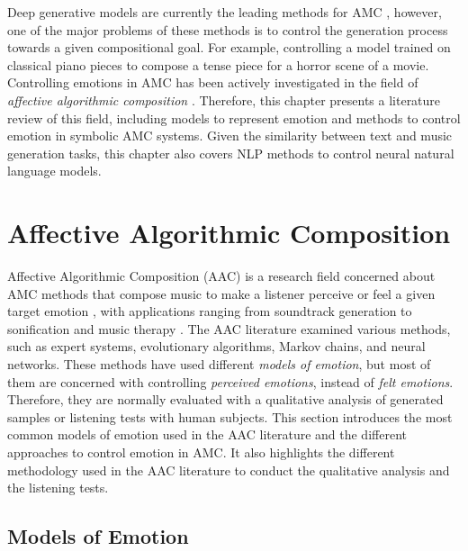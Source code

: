 Deep generative models are currently the leading methods for AMC \cite{yang2019deep}, however, one of the major problems of these methods is to control the generation process towards a given compositional goal. For example, controlling a model trained on classical piano pieces to compose a tense piece for a horror scene of a movie. Controlling emotions in AMC has been actively investigated in the field of \textit{affective algorithmic composition} \cite{williams2015investigating}. Therefore, this chapter presents a literature review of this field, including models to represent emotion and methods to control emotion in symbolic AMC systems. Given the similarity between text and music generation tasks, this chapter also covers NLP methods to control neural natural language models.

\section{Affective Algorithmic Composition}

Affective Algorithmic Composition (AAC) is a research field concerned about AMC methods that compose music to make a listener perceive or feel a given target emotion \cite{williams2015investigating}, with applications ranging from soundtrack generation \cite{williams2015dynamic} to sonification \cite{Chen2015} and music therapy \cite{miranda2011brain}. The AAC literature examined various methods, such as expert systems, evolutionary algorithms, Markov chains, and neural networks. These methods have used different \textit{models of emotion}, but most of them are concerned with controlling \textit{perceived emotions}, instead of \textit{felt emotions}. Therefore, they are normally evaluated with a qualitative analysis of generated samples or listening tests with human subjects. This section introduces the most common models of emotion used in the AAC literature and the different approaches to control emotion in AMC. It also highlights the different methodology used in the AAC literature to conduct the qualitative analysis and the listening tests.

\subsection{Models of Emotion}

